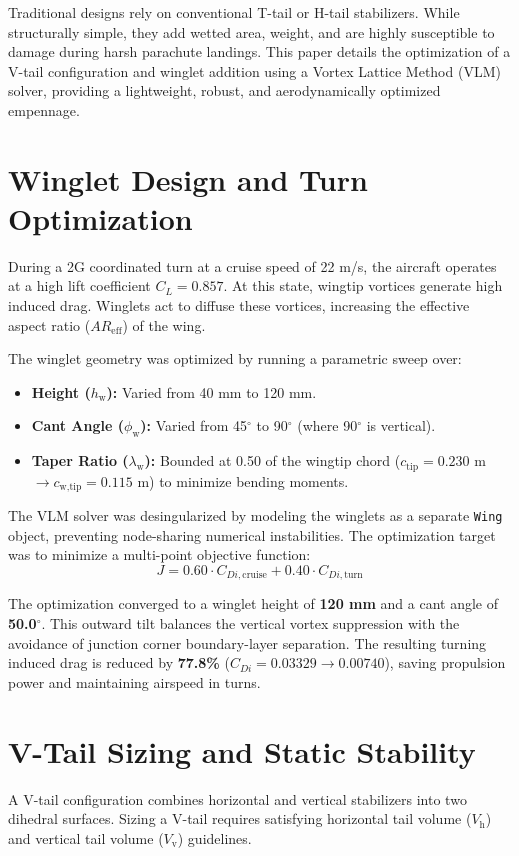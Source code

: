 \documentclass[11pt]{article}
\begin{document}
Traditional designs rely on conventional T-tail or H-tail stabilizers. While structurally simple, they add wetted area, weight, and are highly susceptible to damage during harsh parachute landings. This paper details the optimization of a V-tail configuration and winglet addition using a Vortex Lattice Method (VLM) solver, providing a lightweight, robust, and aerodynamically optimized empennage.

\section{Winglet Design and Turn Optimization}
During a 2G coordinated turn at a cruise speed of 22 m/s, the aircraft operates at a high lift coefficient $C_L = 0.857$. At this state, wingtip vortices generate high induced drag. Winglets act to diffuse these vortices, increasing the effective aspect ratio ($AR_{\text{eff}}$) of the wing.

The winglet geometry was optimized by running a parametric sweep over:
\begin{itemize}
    \item \textbf{Height ($h_{\text{w}}$):} Varied from 40 mm to 120 mm.
    \item \textbf{Cant Angle ($\phi_{\text{w}}$):} Varied from 45$^\circ$ to 90$^\circ$ (where 90$^\circ$ is vertical).
    \item \textbf{Taper Ratio ($\lambda_{\text{w}}$):} Bounded at 0.50 of the wingtip chord ($c_{\text{tip}} = 0.230$ m $\rightarrow c_{\text{w,tip}} = 0.115$ m) to minimize bending moments.
\end{itemize}

The VLM solver was desingularized by modeling the winglets as a separate \texttt{Wing} object, preventing node-sharing numerical instabilities. The optimization target was to minimize a multi-point objective function:
\begin{equation}
    J = 0.60 \cdot C_{Di,\text{cruise}} + 0.40 \cdot C_{Di,\text{turn}}
\end{equation}

The optimization converged to a winglet height of \textbf{120 mm} and a cant angle of \textbf{50.0$^\circ$}. This outward tilt balances the vertical vortex suppression with the avoidance of junction corner boundary-layer separation. The resulting turning induced drag is reduced by \textbf{77.8\%} ($C_{Di} = 0.03329 \rightarrow 0.00740$), saving propulsion power and maintaining airspeed in turns.

\section{V-Tail Sizing and Static Stability}
A V-tail configuration combines horizontal and vertical stabilizers into two dihedral surfaces. Sizing a V-tail requires satisfying horizontal tail volume ($V_{\text{h}}$) and vertical tail volume ($V_{\text{v}}$) guidelines. 
\end{document}
